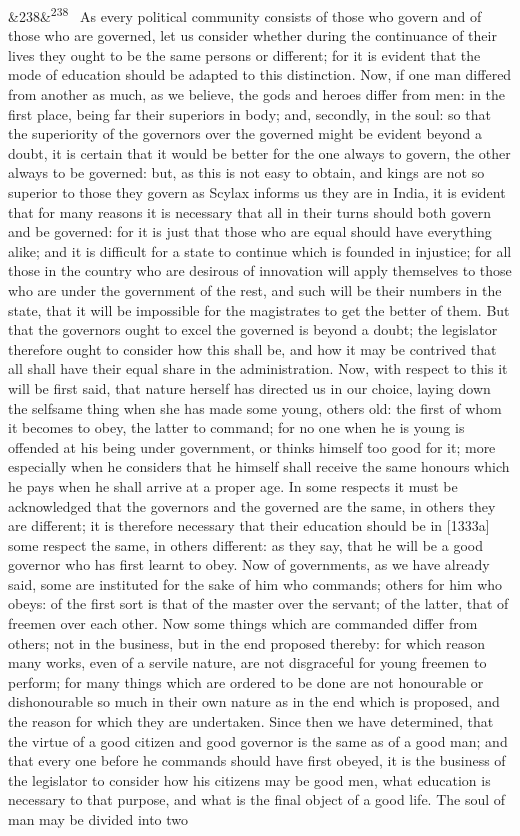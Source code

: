 \documentclass[12pt]{article}
\newcommand{\para}[1][]{\par\noindent\ifx&#1&\else\textsuperscript{\footnotesize #1}~\fi}
\begin{document}
\para[238] As every political community consists of those who govern and of those who are governed, let us consider whether during the continuance of their lives they ought to be the same persons or different; for it is evident that the mode of education should be adapted to this distinction. Now, if one man differed from another as much, as we believe, the gods and heroes differ from men: in the first place, being far their superiors in body; and, secondly, in the soul: so that the superiority of the governors over the governed might be evident beyond a doubt, it is certain that it would be better for the one always to govern, the other always to be governed: but, as this is not easy to obtain, and kings are not so superior to those they govern as Scylax informs us they are in India, it is evident that for many reasons it is necessary that all in their turns should both govern and be governed: for it is just that those who are equal should have everything alike; and it is difficult for a state to continue which is founded in injustice; for all those in the country who are desirous of innovation will apply themselves to those who are under the government of the rest, and such will be their numbers in the state, that it will be impossible for the magistrates to get the better of them. But that the governors ought to excel the governed is beyond a doubt; the legislator therefore ought to consider how this shall be, and how it may be contrived that all shall have their equal share in the administration. Now, with respect to this it will be first said, that nature herself has directed us in our choice, laying down the selfsame thing when she has made some young, others old: the first of whom it becomes to obey, the latter to command; for no one when he is young is offended at his being under government, or thinks himself too good for it; more especially when he considers that he himself shall receive the same honours which he pays when he shall arrive at a proper age. In some respects it must be acknowledged that the governors and the governed are the same, in others they are different; it is therefore necessary that their education should be in [1333a] some respect the same, in others different: as they say, that he will be a good governor who has first learnt to obey. Now of governments, as we have already said, some are instituted for the sake of him who commands; others for him who obeys: of the first sort is that of the master over the servant; of the latter, that of freemen over each other. Now some things which are commanded differ from others; not in the business, but in the end proposed thereby: for which reason many works, even of a servile nature, are not disgraceful for young freemen to perform; for many things which are ordered to be done are not honourable or dishonourable so much in their own nature as in the end which is proposed, and the reason for which they are undertaken. Since then we have determined, that the virtue of a good citizen and good governor is the same as of a good man; and that every one before he commands should have first obeyed, it is the business of the legislator to consider how his citizens may be good men, what education is necessary to that purpose, and what is the final object of a good life. The soul of man may be divided into two 
\end{document}
